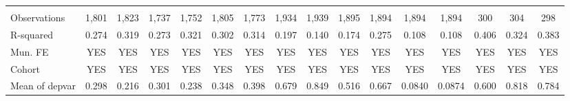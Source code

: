 \begin{tabular}{lccccccccccccccc}
 &  &  &  &  &  &  &  &  &  &  &  &  &  &  &  \\
Observations & 1,801 & 1,823 & 1,737 & 1,752 & 1,805 & 1,773 & 1,934 & 1,939 & 1,895 & 1,894 & 1,894 & 1,894 & 300 & 304 & 298 \\
R-squared & 0.274 & 0.319 & 0.273 & 0.321 & 0.302 & 0.314 & 0.197 & 0.140 & 0.174 & 0.275 & 0.108 & 0.108 & 0.406 & 0.324 & 0.383 \\
Mun. FE & YES & YES & YES & YES & YES & YES & YES & YES & YES & YES & YES & YES & YES & YES & YES \\
Cohort & YES & YES & YES & YES & YES & YES & YES & YES & YES & YES & YES & YES & YES & YES & YES \\
 Mean of depvar & 0.298 & 0.216 & 0.301 & 0.238 & 0.348 & 0.398 & 0.679 & 0.849 & 0.516 & 0.667 & 0.0840 & 0.0874 & 0.600 & 0.818 & 0.784 \\ \hline
\end{tabular}
